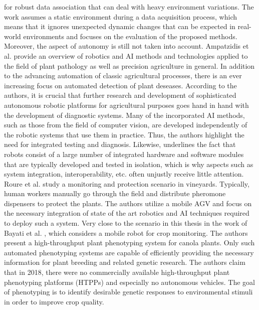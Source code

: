 \documentclass[english, master, utf8]{base/thesis_KBS}
\begin{document}
for robust data association that can deal with heavy environment variations. The work assumes a static environment during a data acquisition process, which means that it ignores
unexpected dynamic changes that can be expected in real-world environments and focuses on the evaluation of the proposed methods. Moreover, the aspect of autonomy is still not taken
into account.\newline
Ampatzidis et al. \cite{Ampatzidis:2017} provide an overview of robotics and AI methods and technologies applied to the field of plant pathology as well as precision agriculture
in general. In addition to the advancing automation of classic agricultural processes, there is an ever increasing focus on automated detection of plant deseases.
\cite{Ampatzidis:2017} According to the authors, it is crucial that further research and development of sophisticated autonomous robotic platforms for agricultural purposes
goes hand in hand with the development of diagnostic systems. Many of the incorporated AI methods, such as those from the field of computer vision, are developed independently of
the robotic systems that use them in practice. \cite{Ampatzidis:2017} Thus, the authors highlight the need for integrated testing and diagnosis.
Likewise, \cite{Roucek:2021} underlines the fact that robots consist of a large number of integrated hardware and software modules that are typically developed and
tested in isolation, which is why aspects such as system integration, interoperability, etc. often unjustly receive little attention.\newline
Roure et al. \cite{Roure:2018} study a monitoring and protection scenario in vineyards. Typically, human workers manually go through the field and distribute pheromone dispensers
to protect the plants. \cite{Roure:2018} The authors utilize a mobile AGV and focus on the necessary integration of state of the art robotics and AI techniques required to deploy
such a system.\newline
Very close to the scenario in this thesis in the work of Bayati et al. \cite{Bayati:2018}, which considers a mobile robot for crop monitoring. The authors present a high-throughput
plant phenotyping system for canola plants. Only such automated phenotyping systems are capable of efficiently providing the necessary information for plant breeding and related
genetic research. \cite{Bayati:2018} The authors claim that in 2018, there were no commercially available high-throughput plant phenotyping platforms (HTPPs) and especially no
autonomous vehicles. The goal of phenotyping is to identify desirable genetic responses to environmental stimuli in order to improve crop quality. \cite{Bayati:2018}
\end{document}
